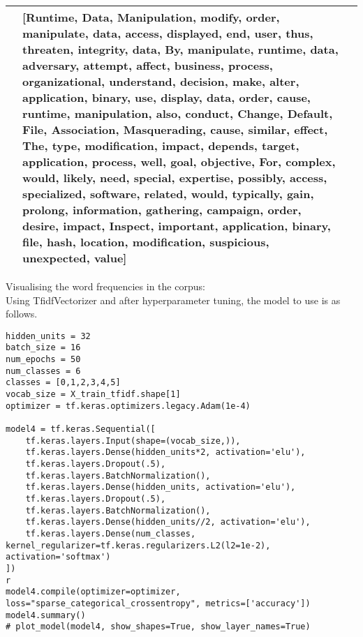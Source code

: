 \begin{table}[h]
\begin{tabularx}{\textwidth}{p{}XX}
        &
        [Runtime, Data, Manipulation, modify, order, manipulate, data, access, displayed, end, user, thus, threaten, integrity, data, By, manipulate, runtime, data, adversary, attempt, affect, business, process, organizational, understand, decision, make, alter, application, binary, use, display, data, order, cause, runtime, manipulation, also, conduct, Change, Default, File, Association, Masquerading, cause, similar, effect, The, type, modification, impact, depends, target, application, process, well, goal, objective, For, complex, would, likely, need, special, expertise, possibly, access, specialized, software, related, would, typically, gain, prolong, information, gathering, campaign, order, desire, impact, Inspect, important, application, binary, file, hash, location, modification, suspicious, unexpected, value] \\
        \bottomrule
    \end{tabularx}
\end{table}
\clearpage
Visualising the word frequencies in the corpus:\\
Using TfidfVectorizer and after hyperparameter tuning, the model to use is as follows.
\begin{lstlisting}[frame=single]
hidden_units = 32
batch_size = 16
num_epochs = 50
num_classes = 6
classes = [0,1,2,3,4,5]
vocab_size = X_train_tfidf.shape[1]
optimizer = tf.keras.optimizers.legacy.Adam(1e-4)

model4 = tf.keras.Sequential([
    tf.keras.layers.Input(shape=(vocab_size,)),
    tf.keras.layers.Dense(hidden_units*2, activation='elu'),
    tf.keras.layers.Dropout(.5),
    tf.keras.layers.BatchNormalization(),
    tf.keras.layers.Dense(hidden_units, activation='elu'),
    tf.keras.layers.Dropout(.5),
    tf.keras.layers.BatchNormalization(),
    tf.keras.layers.Dense(hidden_units//2, activation='elu'),
    tf.keras.layers.Dense(num_classes, kernel_regularizer=tf.keras.regularizers.L2(l2=1e-2), activation='softmax')
])
r
model4.compile(optimizer=optimizer, loss="sparse_categorical_crossentropy", metrics=['accuracy'])
model4.summary()
# plot_model(model4, show_shapes=True, show_layer_names=True)
\end{lstlisting}

